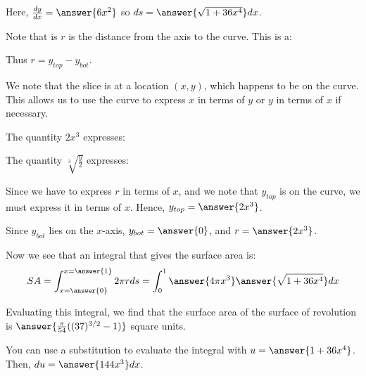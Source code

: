 \documentclass{ximera}
\begin{document}
\begin{exercise}
\begin{exercise}
\begin{exercise}
Here, $\frac{dy}{dx}=\answer{6x^2}$ so $ds= \answer{\sqrt{1+ 36 x^4}} dx$. 
\end{exercise}

\begin{exercise}
Note that is $r$ is the distance from the axis to the curve. This is a:

\begin{multipleChoice}
\end{multipleChoice} 
Thus $r=y_{top}-y_{bot}$.  

We note that the slice is at a location $(x,y)$, which happens to be on the curve.  This allows us to use the curve to express $x$ in terms of $y$ or $y$ in terms of $x$ if necessary.  

The quantity $2x^3$ expresses:
\begin{multipleChoice}
\end{multipleChoice} 

The quantity $\sqrt[3]{\frac{y}{2}}$ expresses:
\begin{multipleChoice}
\end{multipleChoice} 

Since we have to express $r$ in terms of $x$, and we note that $y_{top}$ is on the curve, we must express it in terms of $x$.  Hence, $y_{top} = \answer{2x^3}$.

Since $y_{bot}$ lies on the $x$-axis, $y_{bot} = \answer{0}$, and $r= \answer{2x^3}$.

\end{exercise}

\begin{exercise}
Now we see that an integral that gives the surface area is: 
\[
SA= \int_{x=\answer{0}}^{x=\answer{1}} 2 \pi r ds = \int_0^1 \answer{4 \pi x^3} \answer{\sqrt{1+36x^4}} dx 
\]

\begin{exercise}
Evaluating this integral, we find that the surface area of the surface of revolution is $\answer{\frac \pi {54} ((37)^{3/2} -1)}$ square units. 

\begin{hint} You can use a substitution to evaluate the integral with $u= \answer{1+36x^4}$.  Then, $du= \answer{144x^3} dx$. 


\end{hint}
\end{exercise}
\end{exercise}
\end{exercise}
\end{exercise}
\end{document}
